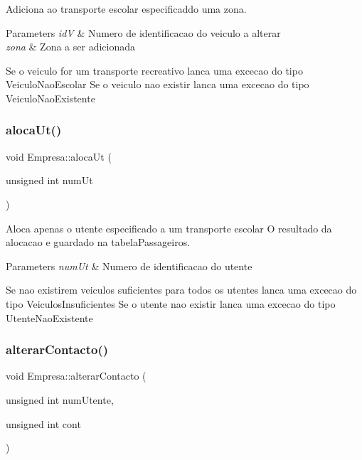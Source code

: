 Adiciona ao transporte escolar especificaddo uma zona. 


\begin{DoxyParams}{Parameters}
{\em idV} & Numero de identificacao do veiculo a alterar \\
\hline
{\em zona} & Zona a ser adicionada\\
\hline
\end{DoxyParams}
Se o veiculo for um transporte recreativo lanca uma excecao do tipo Veiculo\+Nao\+Escolar Se o veiculo nao existir lanca uma excecao do tipo Veiculo\+Nao\+Existente \mbox{\label{class_empresa_a01d9d82ed48240d69fcb99f82f4ff404}} 
\subsubsection{\texorpdfstring{aloca\+Ut()}{alocaUt()}}
{\footnotesize\ttfamily void Empresa\+::aloca\+Ut (\begin{DoxyParamCaption}\item[{unsigned int}]{num\+Ut }\end{DoxyParamCaption})}



Aloca apenas o utente especificado a um transporte escolar O resultado da alocacao e guardado na tabela\+Passageiros. 


\begin{DoxyParams}{Parameters}
{\em num\+Ut} & Numero de identificacao do utente\\
\hline
\end{DoxyParams}
Se nao existirem veiculos suficientes para todos os utentes lanca uma excecao do tipo Veiculos\+Insuficientes Se o utente nao existir lanca uma excecao do tipo Utente\+Nao\+Existente \mbox{\label{class_empresa_acde85d7276904f10937a41f60060cd67}} 
\subsubsection{\texorpdfstring{alterar\+Contacto()}{alterarContacto()}}
{\footnotesize\ttfamily void Empresa\+::alterar\+Contacto (\begin{DoxyParamCaption}\item[{unsigned int}]{num\+Utente,  }\item[{unsigned int}]{cont }\end{DoxyParamCaption})}



